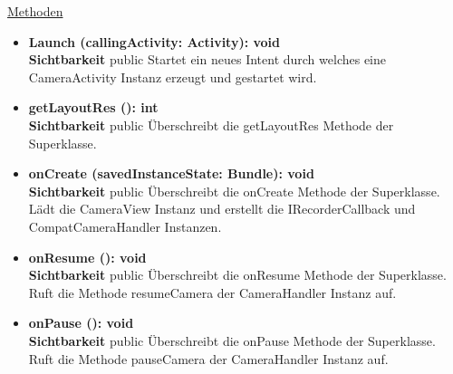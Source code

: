 \underline{Methoden}
\begin{itemize}
\itemsep0pt

\item \textbf{Launch (callingActivity: Activity): void}\hfill\\
\textbf{Sichtbarkeit} public\newline
Startet ein neues Intent durch welches eine CameraActivity Instanz erzeugt und gestartet wird.

\item \textbf{getLayoutRes (): int}\hfill\\
\textbf{Sichtbarkeit} public\newline
Überschreibt die getLayoutRes Methode der Superklasse.

\item \textbf{onCreate (savedInstanceState: Bundle): void}\hfill\\
\textbf{Sichtbarkeit} public\newline
Überschreibt die onCreate Methode der Superklasse. Lädt die CameraView Instanz und erstellt die IRecorderCallback und CompatCameraHandler Instanzen.

\item \textbf{onResume (): void}\hfill\\
\textbf{Sichtbarkeit} public\newline
Überschreibt die onResume Methode der Superklasse. Ruft die Methode resumeCamera der CameraHandler Instanz auf.

\item \textbf{onPause (): void}\hfill\\
\textbf{Sichtbarkeit} public\newline
Überschreibt die onPause Methode der Superklasse. Ruft die Methode pauseCamera der CameraHandler Instanz auf.

\end{itemize}